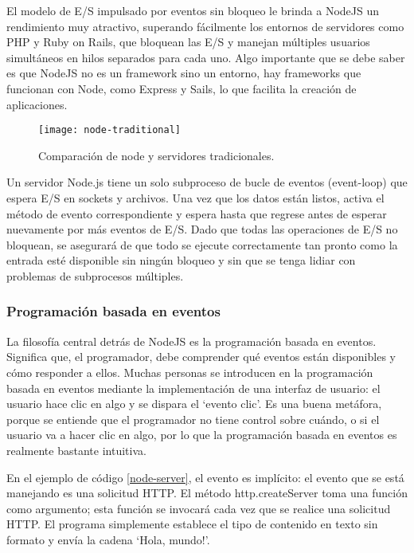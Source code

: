 El modelo de E/S impulsado por eventos sin bloqueo le brinda a NodeJS un rendimiento muy atractivo, superando fácilmente los entornos de servidores como PHP y Ruby on Rails, que bloquean las E/S y manejan múltiples usuarios simultáneos en hilos separados para cada uno. Algo importante que se debe saber es que NodeJS no es un framework sino un entorno, hay frameworks que funcionan con Node, como Express y Sails, lo que facilita la creación de aplicaciones.
\vspace{0.8cm}

\begin{figure}[H]
  \centering
  \texttt{[image: node-traditional]}
  \caption{Comparación de node y servidores tradicionales.}
\end{figure}

Un servidor Node.js tiene un solo subproceso de bucle de eventos (event-loop) que espera E/S en sockets y archivos. Una vez que los datos están listos, activa el método de evento correspondiente y espera hasta que regrese antes de esperar nuevamente por más eventos de E/S. Dado que todas las operaciones de E/S no bloquean, se asegurará de que todo se ejecute correctamente tan pronto como la entrada esté disponible sin ningún bloqueo y sin que se tenga lidiar con problemas de subprocesos múltiples.

\newpage
\subsubsection{Programación basada en eventos}
La filosofía central detrás de NodeJS es la programación basada en eventos. Significa que, el programador,  debe comprender qué eventos están disponibles y cómo responder a ellos. Muchas personas se introducen en la programación basada en eventos mediante la implementación de una interfaz de usuario: el usuario hace clic en algo y se dispara el `evento clic'. Es una buena metáfora, porque se entiende que el programador no tiene control sobre cuándo, o si el usuario va a hacer clic en algo, por lo que la programación basada en eventos es realmente bastante intuitiva.
\vspace{0.8cm}


En el ejemplo de código \ref{node-server}, el evento es implícito: el evento que se está manejando es una solicitud HTTP. El método http.createServer toma una función como argumento; esta función se invocará cada vez que se realice una solicitud HTTP. El programa simplemente establece el tipo de contenido en texto sin formato y envía la cadena `Hola, mundo!'.
